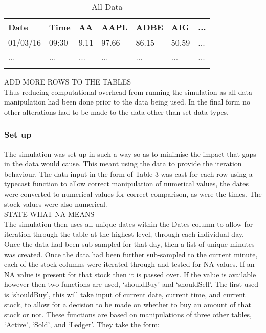 \documentclass[12pt,a4paper]{article}
\begin{document}
\label{units}
\begin{longtable}{ |p{1.5cm}|p{1.5cm}|p{2cm}|p{2cm}|p{2cm}|p{2cm}|p{1.5cm}| }\hline\hline
Date & Time & AA & AAPL & ADBE & AIG & ... \\ \hline
01/03/16 & 09:30 & 9.11 & 97.66 & 86.15 & 50.59 & ... \\ \hline
... & ... & ... & ... & ... & ... & ... \\ \hline
\caption{All Data}
\end{longtable}

ADD MORE ROWS TO THE TABLES\\

Thus reducing computational overhead from running the simulation as all data manipulation had been done prior to the data being used. In the final form no other alterations had to be made to the data other than set data types. 

\subsubsection{Set up}

The simulation was set up in such a way so as to minimise the impact that gaps in the data would cause. This meant using the data to provide the iteration behaviour. The data input in the form of Table 3 was cast for each row using a typecast function to allow correct manipulation of numerical values, the dates were converted to numerical values for correct comparison, as were the times. The stock values were also numerical. \\

STATE WHAT NA MEANS\\

The simulation then uses all unique dates within the Dates column to allow for iteration through the table at the highest level, through each individual day. Once the data had been sub-sampled for that day, then a list of unique minutes was created. Once the data had been further sub-sampled to the current minute, each of the stock columns were iterated through and tested for NA values. If an NA value is present for that stock then it is passed over. If the value is available however then two functions are used, `shouldBuy' and `shouldSell'. The first used is `shouldBuy', this will take input of current date, current time, and current stock, to allow for a decision to be made on whether to buy an amount of that stock or not. These functions are based on manipulations of three other tables, `Active', `Sold', and `Ledger'. They take the form:
\end{document}
